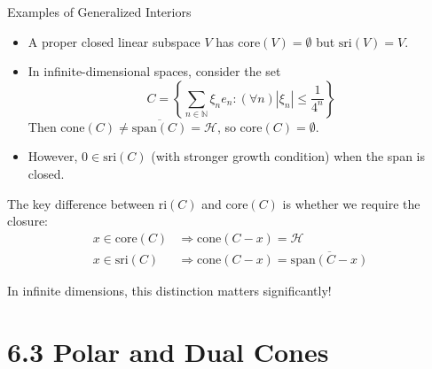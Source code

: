 \documentclass[aspectratio=169,10pt]{beamer}
\begin{document}
\begin{frame}[allowframebreaks]{Examples of Generalized Interiors}
\begin{example}[6.11]
\begin{itemize}
    \item[(i)] A proper closed linear subspace $V$ has $\text{core}(V) = \emptyset$ but $\text{sri}(V) = V$.

    \item[(ii)] In infinite-dimensional spaces, consider the set
    \[
    C = \left\{\sum_{n \in \mathbb{N}} \xi_n e_n : (\forall n) |\xi_n| \leq \frac{1}{4^n}\right\}
    \]
    Then $\text{cone}(C) \neq \overline{\text{span}(C)} = \mathcal{H}$, so $\text{core}(C) = \emptyset$.

    \item[(iii)] However, $0 \in \text{sri}(C)$ (with stronger growth condition) when the span is closed.
\end{itemize}
\end{example}

\framebreak

\begin{key_observation}
The key difference between $\text{ri}(C)$ and $\text{core}(C)$ is whether we require the closure:
\begin{align*}
x \in \text{core}(C) &\Rightarrow \text{cone}(C - x) = \mathcal{H} \\
x \in \text{sri}(C) &\Rightarrow \text{cone}(C - x) = \overline{\text{span}(C - x)}
\end{align*}

In infinite dimensions, this distinction matters significantly!
\end{key_observation}
\end{frame}

\section{6.3 Polar and Dual Cones}
\end{document}
